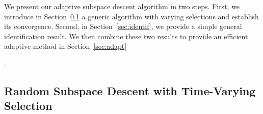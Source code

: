 {%


We present our adaptive subspace descent algorithm in two steps. First, we introduce in Section~\ref{sec:ada_algo} a generic algorithm with varying selections and establish its convergence. %
Second, in Section~\ref{sec:identif}, we provide a simple general identification result. We then combine these two results to provide an efficient adaptive method in Section~\ref{sec:adapt}}. %







\subsection{Random Subspace Descent with Time-Varying Selection}
\label{sec:ada_algo}

